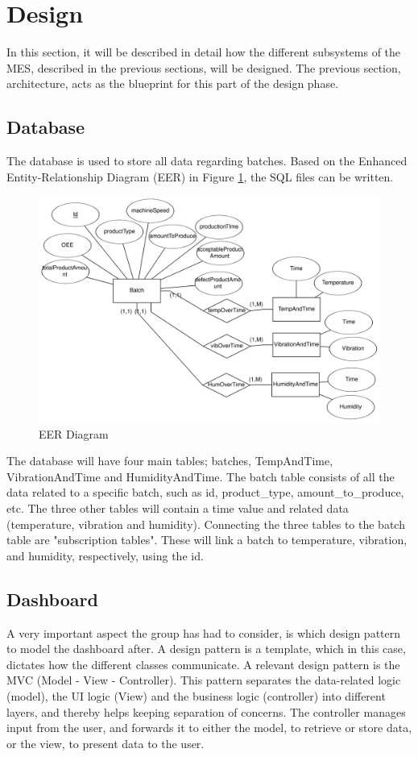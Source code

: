 \section{Design}
In this section, it will be described in detail how the different subsystems of
the MES, described in the previous sections, will be designed. The previous
section, architecture, acts as the blueprint for this part of the design phase.

\subsection{Database}
The database is used to store all data regarding batches. Based on the
Enhanced Entity-Relationship Diagram (EER) in Figure \ref{figure:eer_diagram},
the SQL files can be written.

\begin{figure}[ht]
\centering 
\includegraphics[width=0.8\linewidth]{images/eer_diagrams/database_EER_batch.png}
\caption{EER Diagram} 
\label{figure:eer_diagram}
\end{figure}

The database will have four main tables; batches, TempAndTime, VibrationAndTime and
HumidityAndTime. The batch table consists of all the data related to a
specific batch, such as id, product\_type, amount\_to\_produce, etc. The three
other tables will contain a time value and related data (temperature, vibration
and humidity).
Connecting the three tables to the batch table are "subscription tables".
These will link a batch to temperature, vibration, and humidity, respectively,
using the id.

\subsection{Dashboard}
A very important aspect the group has had to consider, is which design pattern
to model the dashboard after. A design pattern is a template, which in
this case, dictates how the different classes communicate. A relevant design
pattern is the MVC (Model - View - Controller). This pattern separates the
data-related logic (model), the UI logic (View) and the business logic 
(controller) into different layers, and thereby helps keeping separation of
concerns. The controller manages input from the user, and forwards it to either
the model, to retrieve or store data, or the view, to present data to the user.\\

